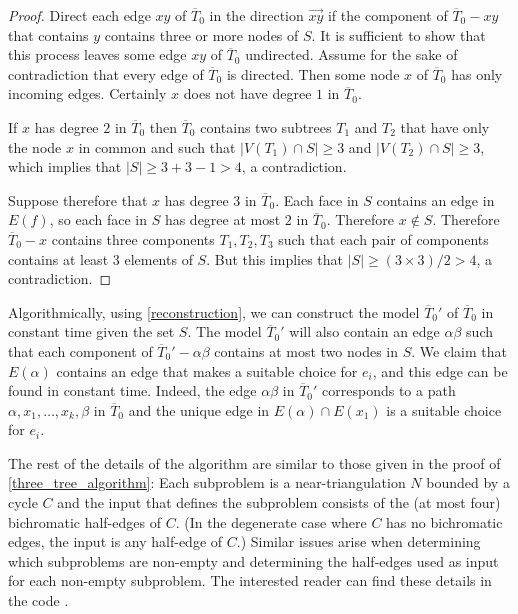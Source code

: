 \documentclass{patmorin}
\begin{document}
\begin{proof}
  Direct each edge $xy$ of $\overline{T}_0$ in the direction $\overrightarrow{xy}$ if the component of $\overline{T}_0-xy$ that contains $y$ contains three or more nodes of $S$.  It is sufficient to show that this process leaves some edge $xy$ of $\overline{T}_0$ undirected.  Assume for the sake of contradiction that every edge of $\overline{T}_0$ is directed.  Then some node $x$ of $\overline{T}_0$ has only incoming edges. Certainly $x$ does not have degree $1$ in $\overline{T}_0$.

  If $x$ has degree $2$ in $\overline{T}_0$ then $\overline{T}_0$ contains two subtrees $T_1$ and $T_2$ that have only the node $x$ in common and such that $|V(T_1)\cap S|\ge 3$ and $|V(T_2)\cap S|\ge 3$, which implies that $|S|\ge 3+3-1 > 4$, a contradiction.

  Suppose therefore that $x$ has degree $3$ in $\overline{T}_0$.  Each face in $S$ contains an edge in $E(f)$, so each face in $S$ has degree at most $2$ in $\overline{T}_0$.  Therefore $x\not\in S$.  Therefore $\overline{T}_0-x$ contains three components $T_1, T_2, T_3$ such that each pair of components contains at least $3$ elements of $S$.  But this implies that $|S|\ge (3\times 3)/2>4$, a contradiction.
\end{proof}



Algorithmically, using \cref{reconstruction}, we can construct the model $\overline{T}_0'$ of $\overline{T}_0$ in constant time given the set $S$.  The model $\overline{T}_0'$ will also contain an edge $\alpha\beta$ such that each component of $\overline{T}_0'-\alpha\beta$ contains at most two nodes in $S$. We claim that $E(\alpha)$ contains an edge that makes a suitable choice for $e_i$, and this edge can be found in constant time.  Indeed, the edge $\alpha\beta$ in  $\overline{T}_0'$ corresponds to a path $\alpha,x_1,\ldots,x_k,\beta$ in $\overline{T}_0$ and the unique edge in $E(\alpha)\cap E(x_1)$ is a suitable choice for $e_i$.  

The rest of the details of the algorithm are similar to those given in the proof of \cref{three_tree_algorithm}:  Each subproblem is a near-triangulation $N$ bounded by a cycle $C$ and the input that defines the subproblem consists of the (at most four) bichromatic half-edges of $C$.
(In the degenerate case where $C$ has no bichromatic edges, the input is any half-edge of $C$.)
Similar issues arise when determining which subproblems are non-empty and determining the half-edges used as input for each non-empty subproblem.  The interested reader can find these details in the code \cite{morin:fatripar,gouin:planar}.
\end{document}
